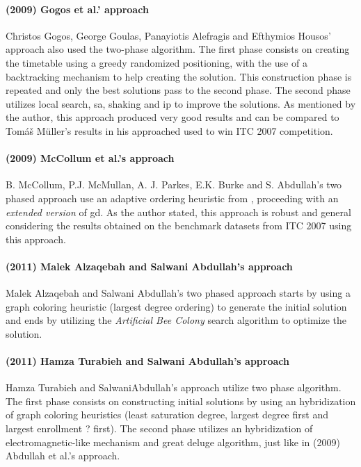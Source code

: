 \paragraph{(2009) Gogos et al.' approach}
Christos Gogos, George Goulas, Panayiotis Alefragis and Efthymios Housos' approach \cite{Gogos2009} also used the two-phase algorithm. The first phase consists on creating the timetable using a greedy randomized positioning, with the use of a backtracking mechanism to help creating the solution. This construction phase is repeated and only the best solutions pass to the second phase. The second phase utilizes local search, \gls{sa}, shaking and \gls{ip} to improve the solutions. As mentioned by the author, this approach produced very good results  and can be compared to Tom\'{a}\v{s} M\"{u}ller's results in his approached used to win ITC 2007 competition.\\

\paragraph{(2009) McCollum et al.'s approach}
B. McCollum, P.J. McMullan, A. J. Parkes, E.K. Burke and S. Abdullah's two phased approach \cite{McCollum2009} use an adaptive ordering heuristic from \cite{Burke2004}, proceeding with an \textit{extended version} of \gls{gd}. As the author stated, this approach is robust and general considering the results obtained on the benchmark datasets from ITC 2007 using this approach.\\

\paragraph{(2011) Malek Alzaqebah and Salwani Abdullah's approach}
Malek Alzaqebah and Salwani Abdullah's two phased approach \cite{Alzaqebah2011} starts by using a graph coloring heuristic (largest degree ordering) to generate the initial solution and ends by utilizing the \textit{Artificial Bee Colony} search algorithm to optimize the solution.\\

\paragraph{(2011) Hamza Turabieh and Salwani Abdullah's approach}
Hamza Turabieh and SalwaniAbdullah's approach \cite{Turabieh2011} utilize two phase algorithm. The first phase consists on constructing initial solutions by using an hybridization of graph coloring heuristics (least saturation degree, largest degree first and largest enrollment {\color{red} ?} first). The second phase utilizes an hybridization of electromagnetic-like mechanism and great deluge algorithm, just like in (2009) Abdullah et al.'s approach.

